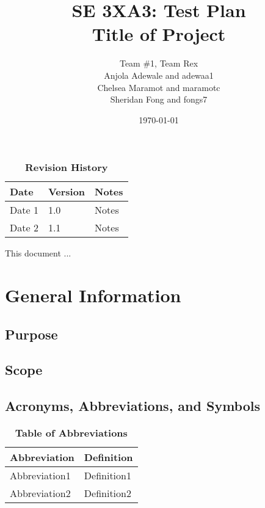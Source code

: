 \documentclass[12pt, titlepage]{article}
\title{SE 3XA3: Test Plan\\Title of Project}
\author{Team \#1, Team Rex
	\\ Anjola Adewale and adewaa1
	\\ Chelsea Maramot and maramotc
	\\ Sheridan Fong and fongs7
}
\date{\today}
\begin{document}
\maketitle

\tableofcontents
\listoftables
\listoffigures

\begin{table}[bp]
\caption{\bf Revision History}
\begin{tabularx}{\textwidth}{p{3cm}p{2cm}X}
\toprule {\bf Date} & {\bf Version} & {\bf Notes}\\
\midrule
Date 1 & 1.0 & Notes\\
Date 2 & 1.1 & Notes\\
\bottomrule
\end{tabularx}
\end{table}

\newpage


This document ...

\section{General Information}

\subsection{Purpose}

\subsection{Scope}

\subsection{Acronyms, Abbreviations, and Symbols}
	
\begin{table}[hbp]
\caption{\textbf{Table of Abbreviations}} \label{Table}

\begin{tabularx}{\textwidth}{p{3cm}X}
\toprule
\textbf{Abbreviation} & \textbf{Definition} \\
\midrule
Abbreviation1 & Definition1\\
Abbreviation2 & Definition2\\
\bottomrule
\end{tabularx}

\end{table}
\end{document}
